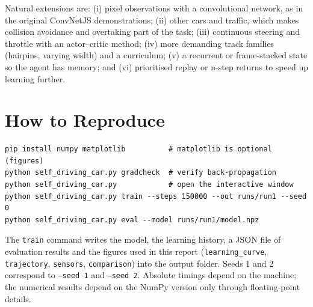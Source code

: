 \documentclass[11pt,a4paper]{article}
\newcommand{\code}[1]{\texttt{#1}}
\begin{document}
Natural extensions are: (i) pixel observations with a convolutional network, as in the original ConvNetJS demonstrations; (ii) other cars and traffic, which makes collision avoidance and overtaking part of the task; (iii) continuous steering and throttle with an actor--critic method; (iv) more demanding track families (hairpins, varying width) and a curriculum; (v) a recurrent or frame-stacked state so the agent has memory; and (vi) prioritised replay or n-step returns to speed up learning further.

\section*{How to Reproduce}
\begin{verbatim}
pip install numpy matplotlib          # matplotlib is optional (figures)
python self_driving_car.py gradcheck  # verify back-propagation
python self_driving_car.py            # open the interactive window
python self_driving_car.py train --steps 150000 --out runs/run1 --seed 0
python self_driving_car.py eval --model runs/run1/model.npz
\end{verbatim}
The \code{train} command writes the model, the learning history, a JSON file of evaluation results and the figures used in this report (\code{learning\_curve}, \code{trajectory}, \code{sensors}, \code{comparison}) into the output folder.
Seeds 1 and 2 correspond to \code{--seed 1} and \code{--seed 2}.
Absolute timings depend on the machine; the numerical results depend on the NumPy version only through floating-point details.
\end{document}
